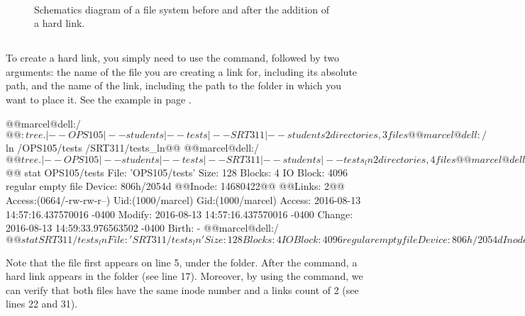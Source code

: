 \begin{figure}[!htbp]
\centering
   \hspace*{-2cm}
        \\
   \hspace*{-2cm}
        \caption[]{Schematics diagram of a file system before and after the addition of a hard link.\label{fig:ch7_hard_link}}
\end{figure}

\subsection{}
To create a hard link, you simply need to use the  command, followed by two arguments: the name of the file you are creating a link for, including its absolute path, and the name of the link, including the path to the folder in which you want to place it. See the example in page \pageref{src:ch7_ex1}.
\begin{source_code}[Bash]
@@marcel@dell:/$@@: tree
.
|-- OPS105
    |-- students
    |-- tests
|-- SRT311
    |-- students
2 directories, 3 files
@@marcel@dell:/$ln /OPS105/tests /SRT311/tests_ln@@
@@marcel@dell:/$@@tree
.
|-- OPS105
    |-- students
    |-- tests
|-- SRT311
    |-- students
    |-- tests_ln
2 directories, 4 files
@@marcel@dell:/$@@ stat OPS105/tests
  File: 'OPS105/tests'
  Size: 128         	Blocks: 4          IO Block: 4096   regular empty file
Device: 806h/2054d	@@Inode: 14680422@@    @@Links: 2@@
Access:(0664/-rw-rw-r--) Uid:(1000/marcel) Gid:(1000/marcel)
Access: 2016-08-13 14:57:16.437570016 -0400
Modify: 2016-08-13 14:57:16.437570016 -0400
Change: 2016-08-13 14:59:33.976563502 -0400
 Birth: -
@@marcel@dell:/$@@ stat SRT311/tests_ln
  File: 'SRT311/tests_ln'
  Size: 128         	Blocks: 4          IO Block: 4096   regular empty file
Device: 806h/2054d	Inode: @@14680422@@    @@Links: 2@@
Access:(0664/-rw-rw-r--) Uid:(1000/marcel) Gid:(1000/marcel)
Access: 2016-08-13 14:57:16.437570016 -0400
Modify: 2016-08-13 14:57:16.437570016 -0400
Change: 2016-08-13 14:59:33.976563502 -0400
 Birth: -
@@marcel@dell:/$
\end{source_code}
\label{src:ch7_ex1}
Note that the file  first appears on line 5, under the  folder. After the  command, a hard link  appears in the  folder (see line 17). Moreover, by using the  command, we can verify that both files have the same inode number and a links count of 2 (see lines 22 and 31).

